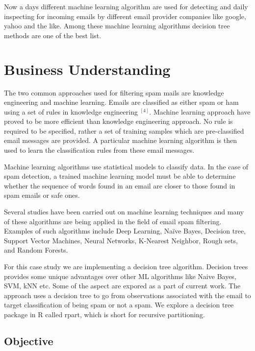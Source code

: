 \documentclass[
]{article}
\begin{document}
Now a days different machine learning algorithm are used for detecting
and daily inspecting for incoming emails by different email provider
companies like google, yahoo and the like. Among these machine learning
algorithms decision tree methods are one of the best list.

\newpage

\hypertarget{business-understanding}{%
\section{Business Understanding}\label{business-understanding}}

The two common approaches used for filtering spam mails are knowledge
engineering and machine learning. Emails are classified as either spam
or ham using a set of rules in knowledge engineering \(^{[4]}\). Machine
learning approach have proved to be more efficient than knowledge
engineering approach. No rule is required to be specified, rather a set
of training samples which are pre-classified email messages are
provided. A particular machine learning algorithm is then used to learn
the classification rules from these email messages.

Machine learning algorithms use statistical models to classify data. In
the case of spam detection, a trained machine learning model must be
able to determine whether the sequence of words found in an email are
closer to those found in spam emails or safe ones.

Several studies have been carried out on machine learning techniques and
many of these algorithms are being applied in the field of email spam
filtering. Examples of such algorithms include Deep Learning, Naïve
Bayes, Decision tree, Support Vector Machines, Neural Networks,
K-Nearest Neighbor, Rough sets, and Random Forests.

For this case study we are implementing a decision tree algorithm.
Decision trees provides some unique advantages over other ML algorithms
like Naive Bayes, SVM, kNN etc. Some of the aspect are expored as a part
of current work. The approach uses a decision tree to go from
observations associated with the email to target classification of being
spam or not a spam. We explore a decision tree package in R called
rpart, which is short for recursive partitioning.

\hypertarget{objective}{%
\subsection{Objective}\label{objective}}
\end{document}

